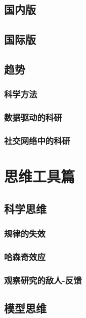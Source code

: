 \documentclass[]{book}
\begin{document}
\section{国内版}

\section{国际版}

\section{趋势}

\subsection{科学方法}

\subsection{数据驱动的科研}

\subsection{社交网络中的科研}

\chapter{思维工具篇}\label{thought}

\section{科学思维}

\subsection{规律的失效}

\subsection{哈森奇效应}

\subsection{观察研究的敌人-反馈}\label{-}

\section{模型思维}
\end{document}
